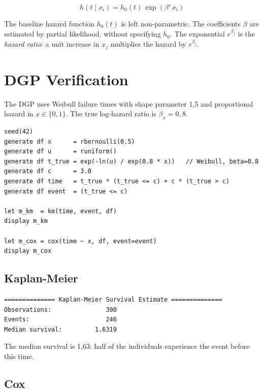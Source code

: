 \[
  h(t \mid x_i) = h_0(t)\,\exp(\beta'\,x_i)
\]

The baseline hazard function $h_0(t)$ is left non-parametric. The
coefficients $\beta$ are estimated by partial likelihood, without
specifying $h_0$. The exponential $e^{\beta_j}$ is the \emph{hazard ratio}:
a unit increase in $x_j$ multiplies the hazard by $e^{\beta_j}$.

\section{DGP Verification}

The DGP uses Weibull failure times with shape parameter 1{,}5 and
proportional hazard in $x \in \{0,1\}$. The true log-hazard ratio is $\beta_x = 0{,}8$.

\begin{lstlisting}[caption={Survival DGP — Weibull with proportional hazard}]
seed(42)
generate df x      = rbernoulli(0.5)
generate df u      = runiform()
generate df t_true = exp(-ln(u) / exp(0.8 * x))   // Weibull, beta=0.8
generate df c      = 3.0
generate df time   = t_true * (t_true <= c) + c * (t_true > c)
generate df event  = (t_true <= c)

let m_km  = km(time, event, df)
display m_km

let m_cox = cox(time ~ x, df, event=event)
display m_cox
\end{lstlisting}

\subsection*{Kaplan-Meier}

\begin{lstlisting}[language={}, basicstyle=\ttfamily\small,
  frame=none, numbers=none, backgroundcolor=\color{codbg},
  xleftmargin=0pt, xrightmargin=0pt, breaklines=false]
============== Kaplan-Meier Survival Estimate ==============
Observations:               300
Events:                     246
Median survival:         1.6319
\end{lstlisting}

The median survival is 1{,}63: half of the individuals experience the
event before this time.

\subsection*{Cox}

